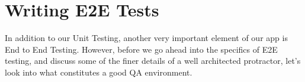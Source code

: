 \maketitle{}
\section{ Writing E2E Tests }

In addition to our Unit Testing, another very important element of our app is
End to End Testing. However, before we go ahead into the specifics of E2E
testing, and discuss some of the finer details of a well architected protractor,
let's look into what constitutes a good QA environment.
